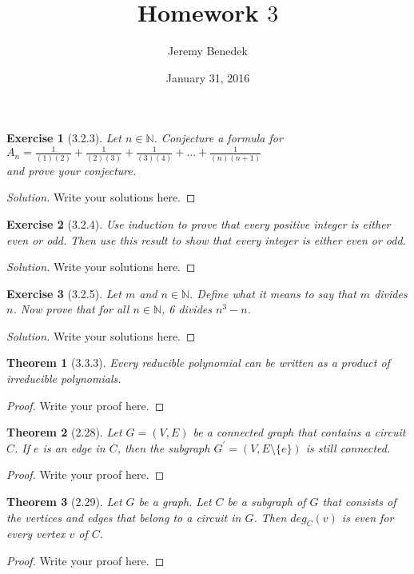 \documentclass{article}
\title{Homework $3$}
\author{Jeremy Benedek}
\date{January 31, 2016}
\newtheorem*{thm}{Theorem}
\newtheorem*{ex}{Exercise}
\newenvironment{solution}
  {\begin{proof}[Solution]}
  {\renewcommand{\qedsymbol}{}\end{proof}}
\begin{document}
\maketitle

\begin{ex}[3.2.3]
	Let $n \in \mathbb{N}$. Conjecture a formula for \\ $A_n = \frac{1}{(1)(2)} + \frac{1}{(2)(3)} + \frac{1}{(3)(4)} + ... + \frac{1}{(n)(n+1)}$
	\\ and prove your conjecture.
\end{ex}
\begin{solution}
    Write your solutions here.
\end{solution}

\begin{ex}[3.2.4]
	Use induction to prove that every positive integer is either even or odd. Then use this result to show that every integer
	is either even or odd.
\end{ex}
\begin{solution}
    Write your solutions here.
\end{solution}

\begin{ex}[3.2.5]
	Let $m$ and $n \in \mathbb{N}$. Define what it means to say that $m$ divides $n$. Now prove that for all $n \in \mathbb{N}$, 6 divides
	$n^3-n$.
\end{ex}
\begin{solution}
    Write your solutions here.
\end{solution}

\begin{thm}[3.3.3]
	Every reducible polynomial can be written as a product of irreducible polynomials.
\end{thm}
\begin{proof}
    Write your proof here.
\end{proof}

\begin{thm}[2.28]
	Let $G= (V,E)$ be a connected graph that contains a circuit $C$. If $e$ is an edge
in $C$, then the subgraph $G^\prime= (V,E \setminus \{e\})$ is still connected.
\end{thm}
\begin{proof}
    Write your proof here.
\end{proof}

\begin{thm}[2.29]
	Let $G$ be a graph. Let $C$ be a subgraph of $G$ that consists of the vertices and edges that belong to a circuit in $G$. Then $deg_C(v)$ is 
	even for every vertex $v$ of $C$.
\end{thm}
\begin{proof}
    Write your proof here.
\end{proof}
\end{document}
